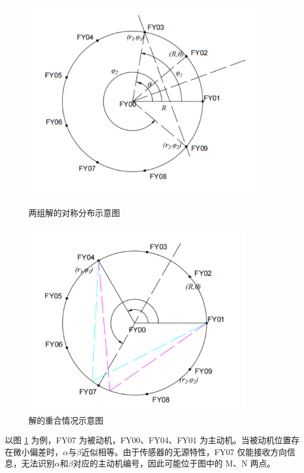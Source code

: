 \documentclass[withoutpreface,bwprint]{cumcmthesis} %
\begin{document}
\begin{figure}[H]
    \centering
    \begin{minipage}{0.49\textwidth}
        \centering
        \includegraphics[width=0.9\textwidth]{../figure/q1_3.png} 
        \caption{两组解的对称分布示意图}
        \label{q1_3}
    \end{minipage}
    \begin{minipage}{0.49\textwidth}
        \centering
        \includegraphics[width=0.86\textwidth]{../figure/q1_4.png} 
        \caption{解的重合情况示意图}
        \label{q1_4}   
    \end{minipage}
\end{figure}

以图 \ref{q1_4} 为例，FY07 为被动机，FY00、FY04、FY01 为主动机。当被动机位置存在微小偏差时，$\alpha$与$\beta$近似相等。由于传感器的无源特性，FY07 仅能接收方向信息，无法识别$\alpha$和$\beta$对应的主动机编号，因此可能位于图中的 M、N 两点。
\end{document}
